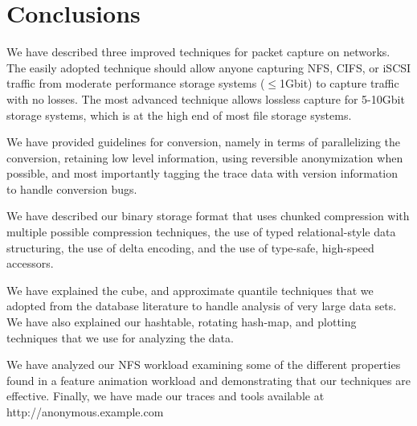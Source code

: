 \section{Conclusions}
\label{sec:conclusion}

We have described three improved techniques for packet capture on
networks.  The easily adopted technique should allow anyone capturing
NFS, CIFS, or iSCSI traffic from moderate performance storage systems
($\leq$1Gbit) to capture traffic with no losses.  The most advanced
technique allows lossless capture for 5-10Gbit storage systems, which
is at the high end of most file storage systems. 

We have provided guidelines for conversion, namely in terms of
parallelizing the conversion, retaining low level information, using
reversible anonymization when possible, and most importantly tagging
the trace data with version information to handle conversion bugs.

We have described our binary storage format that uses chunked
compression with multiple possible compression techniques, the use of
typed relational-style data structuring, the use of delta encoding,
and the use of type-safe, high-speed accessors.

We have explained the cube, and approximate quantile techniques that
we adopted from the database literature to handle analysis of very
large data sets.  We have also explained our hashtable, rotating
hash-map, and plotting techniques that we use for analyzing the data.

We have analyzed our NFS workload examining some of the different
properties found in a feature animation workload and demonstrating
that our techniques are effective.  Finally, we have made our traces
and tools available at http://anonymous.example.com


